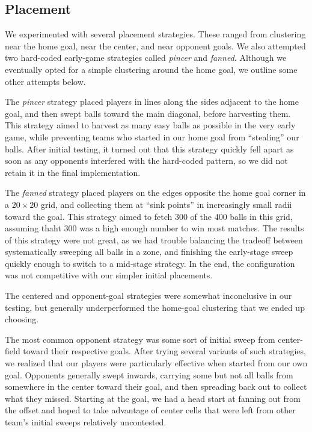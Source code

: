 \documentclass[
10pt, %
letterpaper, %
oneside, %
headinclude,footinclude, %
english
]{article}
\begin{document}
\subsection{Placement}
We experimented with several placement strategies. These ranged from clustering near the home goal, near the center, and near opponent goals. We also attempted two hard-coded early-game strategies called \emph{pincer} and \emph{fanned}. Although we eventually opted for a simple clustering around the home goal, we outline some other attempts below.

The \emph{pincer} strategy placed players in lines along the sides adjacent to the home goal, and then swept balls toward the main diagonal, before harvesting them. This strategy aimed to harvest as many easy balls as possible in the very early game, while preventing teams who started in our home goal from ``stealing'' our balls. After initial testing, it turned out that this strategy quickly fell apart as soon as any opponents interfered with the hard-coded pattern, so we did not retain it in the final implementation.

The \emph{fanned} strategy placed players on the edges opposite the home goal corner in a $20 \times 20$ grid, and collecting them at ``sink points'' in increasingly small radii toward the goal. This strategy aimed to fetch 300 of the 400 balls in this grid, assuming thaht 300 was a high enough number to win most matches. The results of this strategy were not great, as we had trouble balancing the tradeoff between systematically sweeping all balls in a zone, and finishing the early-stage sweep quickly enough to switch to a mid-stage strategy. In the end, the configuration was not competitive with our simpler initial placements.

The centered and opponent-goal strategies were somewhat inconclusive in our testing, but generally underperformed the home-goal clustering that we ended up choosing.

The most common opponent strategy was some sort of initial sweep from center-field toward their respective goals. After trying several variants of such strategies, we realized that our players were particularly effective when started from our own goal. Opponents generally swept inwards, carrying some but not all balls from somewhere in the center toward their goal, and then spreading back out to collect what they missed. Starting at the goal, we had a head start at fanning out from the offset and hoped to take advantage of center cells that were left from other team's initial sweeps relatively uncontested.
\end{document}
